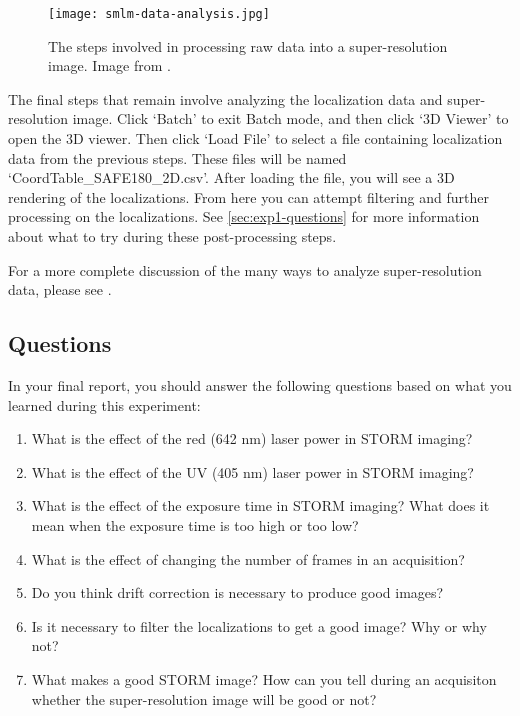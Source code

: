\documentclass[10pt,a4paper,oneside]{book}
\begin{document}
\begin{figure}
    \centering
    \texttt{[image: smlm-data-analysis.jpg]}
    \caption{The steps involved in processing raw data into a super-resolution image. Image from \cite{martens-frontiersinbioinformatics-2022}.}
    \label{fig:smlm-data-analysis}
\end{figure}

The final steps that remain involve analyzing the localization data and super-resolution image. Click `Batch' to exit Batch mode, and then click `3D Viewer' to open the 3D viewer. Then click `Load File' to select a file containing localization data from the previous steps. These files will be named `CoordTable\_SAFE180\_2D.csv'. After loading the file, you will see a 3D rendering of the localizations. From here you can attempt filtering and further processing on the localizations. See \autoref{sec:exp1-questions} for more information about what to try during these post-processing steps.

For a more complete discussion of the many ways to analyze super-resolution data, please see \cite{martens-frontiersinbioinformatics-2022}.

\subsection{Questions}\label{sec:exp1-questions}

In your final report, you should answer the following questions based on what you learned during this experiment:

\begin{enumerate}
    \item{What is the effect of the red (642 nm) laser power in STORM imaging?}
    \item{What is the effect of the UV (405 nm) laser power in STORM imaging?}
    \item{What is the effect of the exposure time in STORM imaging? What does it mean when the exposure time is too high or too low?}
    \item{What is the effect of changing the number of frames in an acquisition?}
    \item{Do you think drift correction is necessary to produce good images?}
    \item{Is it necessary to filter the localizations to get a good image? Why or why not?}
    \item{What makes a good STORM image? How can you tell during an acquisiton whether the super-resolution image will be good or not?}
\end{enumerate}
\end{document}
